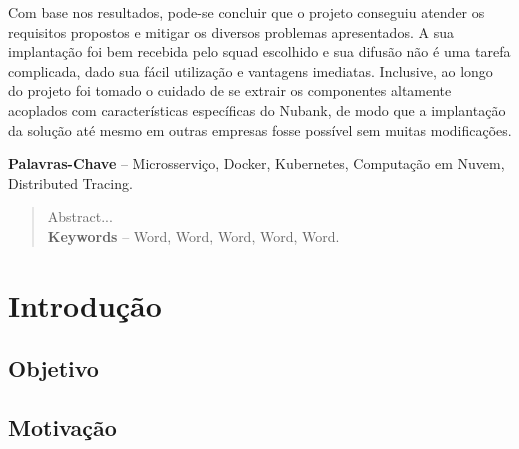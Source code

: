 \documentclass[]{politex}
\begin{document}
\begin{resumo}
	Com base nos resultados, pode-se concluir que o projeto conseguiu atender os requisitos propostos e mitigar os diversos problemas apresentados. A sua implantação foi bem recebida pelo squad escolhido e sua difusão não é uma tarefa complicada, dado sua fácil utilização e vantagens imediatas. Inclusive, ao longo do projeto foi tomado o cuidado de se extrair os componentes altamente acoplados com características específicas do Nubank, de modo que a implantação da solução até mesmo em outras empresas fosse possível sem muitas modificações.
	
%
%
\textbf{Palavras-Chave} -- Microsserviço, Docker, Kubernetes, Computação em Nuvem, Distributed Tracing.
\end{resumo}


\begin{abstract}
Abstract...
%
\\[3\baselineskip]
%
\textbf{Keywords} -- Word, Word, Word, Word, Word.
\end{abstract}






\sumario




	
\chapter{Introdução}
	\section{Objetivo}
	\section{Motivação}
\end{document}
